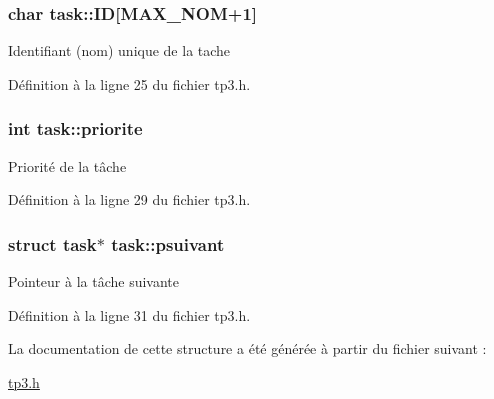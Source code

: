 \hypertarget{structtask_a8d5cab5aec1912aa7a0c48ec8b587c29}{
\subsubsection[{\-I\-D}]{\setlength{\rightskip}{0pt plus 5cm}char {\bf task\-::\-I\-D}\mbox{[}\-M\-A\-X\-\_\-\-N\-O\-M+1\mbox{]}}}
\label{structtask_a8d5cab5aec1912aa7a0c48ec8b587c29}
\-Identifiant (nom) unique de la tache 

\-Définition à la ligne 25 du fichier tp3.\-h.

\hypertarget{structtask_ac69cbf3c1c4c28c5b6dca044cd0601ef}{
\subsubsection[{priorite}]{\setlength{\rightskip}{0pt plus 5cm}int {\bf task\-::priorite}}}
\label{structtask_ac69cbf3c1c4c28c5b6dca044cd0601ef}
\-Priorité de la tâche 

\-Définition à la ligne 29 du fichier tp3.\-h.

\hypertarget{structtask_a4f77f9c66de469188601035b9f343680}{
\subsubsection[{psuivant}]{\setlength{\rightskip}{0pt plus 5cm}struct {\bf task}$\ast$ {\bf task\-::psuivant}}}
\label{structtask_a4f77f9c66de469188601035b9f343680}
\-Pointeur à la tâche suivante 

\-Définition à la ligne 31 du fichier tp3.\-h.



\-La documentation de cette structure a été générée à partir du fichier suivant \-:\begin{DoxyCompactItemize}
\item 
\hyperlink{tp3_8h}{tp3.\-h}\end{DoxyCompactItemize}
